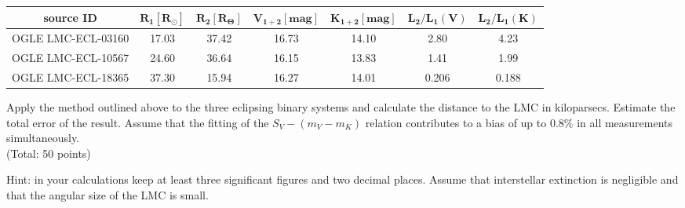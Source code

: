 \documentclass[10pt]{article}
\begin{document}
\begin{center}
\begin{tabular}{|c|c|c|c|c|c|c|}
\hline
source ID & $\boldsymbol{R}_{\mathbf{1}}\left[\boldsymbol{R}_{\boldsymbol{\odot}}\right]$ & $\boldsymbol{R}_{\mathbf{2}}\left[\boldsymbol{R}_{\boldsymbol{\Theta}}\right]$ & $\boldsymbol{V}_{\mathbf{1 + 2}}[\mathbf{m a g}]$ & $\boldsymbol{K}_{\mathbf{1 + 2}}[\mathbf{m a g}]$ & $\boldsymbol{L}_{\mathbf{2}} / \boldsymbol{L}_{\mathbf{1}}(\boldsymbol{V})$ & $\boldsymbol{L}_{\mathbf{2}} / \boldsymbol{L}_{\mathbf{1}}(\boldsymbol{K})$ \\
\hline
OGLE LMC-ECL-03160 & 17.03 & 37.42 & 16.73 & 14.10 & 2.80 & 4.23 \\
\hline
OGLE LMC-ECL-10567 & 24.60 & 36.64 & 16.15 & 13.83 & 1.41 & 1.99 \\
\hline
OGLE LMC-ECL-18365 & 37.30 & 15.94 & 16.27 & 14.01 & 0.206 & 0.188 \\
\hline
\end{tabular}
\end{center}

Apply the method outlined above to the three eclipsing binary systems and calculate the distance to the LMC in kiloparsecs. Estimate the total error of the result. Assume that the fitting of the $S_{V}-\left(m_{V}-m_{K}\right)$ relation contributes to a bias of up to $0.8 \%$ in all measurements simultaneously.\\
(Total: 50 points)

Hint: in your calculations keep at least three significant figures and two decimal places. Assume that interstellar extinction is negligible and that the angular size of the LMC is small.
\end{document}

